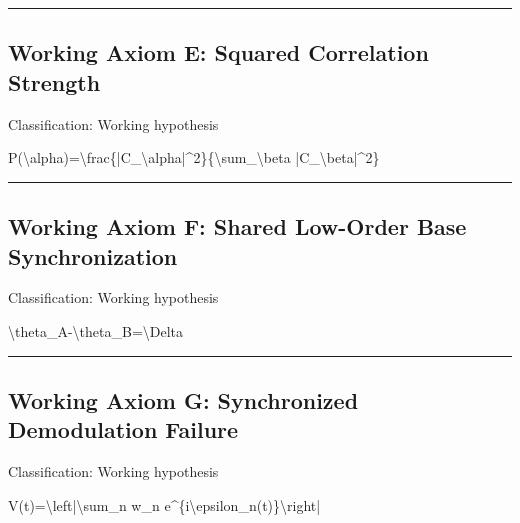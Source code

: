 \documentclass[
  a4paper,
]{article}
\newenvironment{Shaded}{}{}
\newcommand{\NormalTok}[1]{#1}
\begin{document}
\begin{center}\rule{0.5\linewidth}{0.5pt}\end{center}

\subsection{Working Axiom E: Squared Correlation
Strength}\label{working-axiom-e-squared-correlation-strength}

Classification: Working hypothesis

\begin{Shaded}
\begin{Highlighting}[]
\NormalTok{P(\textbackslash{}alpha)=\textbackslash{}frac\{|C\_\textbackslash{}alpha|\^{}2\}\{\textbackslash{}sum\_\textbackslash{}beta |C\_\textbackslash{}beta|\^{}2\}}
\end{Highlighting}
\end{Shaded}

\begin{center}\rule{0.5\linewidth}{0.5pt}\end{center}

\subsection{Working Axiom F: Shared Low-Order Base
Synchronization}\label{working-axiom-f-shared-low-order-base-synchronization}

Classification: Working hypothesis

\begin{Shaded}
\begin{Highlighting}[]
\NormalTok{\textbackslash{}theta\_A{-}\textbackslash{}theta\_B=\textbackslash{}Delta}
\end{Highlighting}
\end{Shaded}

\begin{center}\rule{0.5\linewidth}{0.5pt}\end{center}

\subsection{Working Axiom G: Synchronized Demodulation
Failure}\label{working-axiom-g-synchronized-demodulation-failure}

Classification: Working hypothesis

\begin{Shaded}
\begin{Highlighting}[]
\NormalTok{V(t)=\textbackslash{}left|\textbackslash{}sum\_n w\_n e\^{}\{i\textbackslash{}epsilon\_n(t)\}\textbackslash{}right|}
\end{Highlighting}
\end{Shaded}
\end{document}
